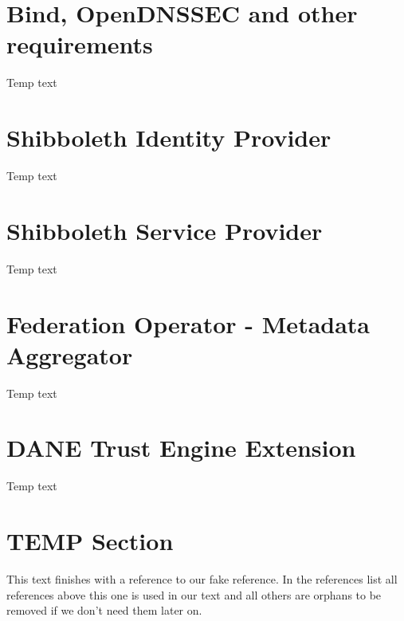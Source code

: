 \section{Bind, OpenDNSSEC and other requirements}
Temp text
\section{Shibboleth Identity Provider}
Temp text
\section{Shibboleth Service Provider}
Temp text
\section{Federation Operator - Metadata Aggregator}
Temp text
\section{DANE Trust Engine Extension}
Temp text


\section{TEMP Section}
This text finishes with a reference to our fake reference.
In the references list all references above this one is used in our text and all others are orphans to be removed if we don't need them later on.\cite{fake}
\nocite{*}
